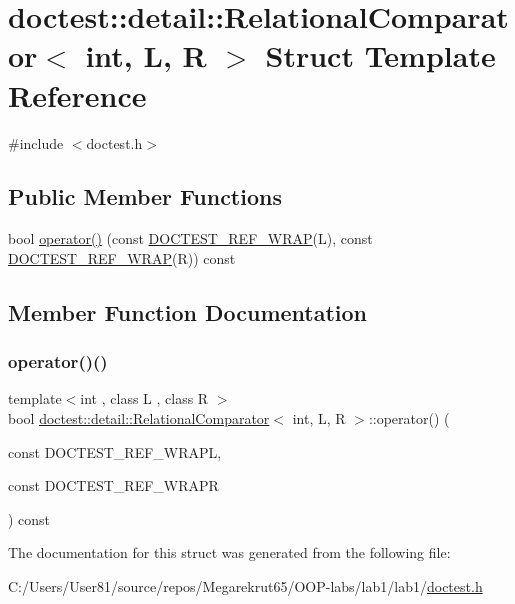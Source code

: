 \hypertarget{structdoctest_1_1detail_1_1_relational_comparator}{}\section{doctest\+:\+:detail\+:\+:Relational\+Comparator$<$ int, L, R $>$ Struct Template Reference}
\label{structdoctest_1_1detail_1_1_relational_comparator}


{\ttfamily \#include $<$doctest.\+h$>$}

\subsection*{Public Member Functions}
\begin{DoxyCompactItemize}
\item 
bool \mbox{\hyperlink{structdoctest_1_1detail_1_1_relational_comparator_a51062ad46cd23c982838a0a51df70512}{operator()}} (const \mbox{\hyperlink{doctest_8h_af2901cafb023c57fb672ccb1bf14f2eb}{D\+O\+C\+T\+E\+S\+T\+\_\+\+R\+E\+F\+\_\+\+W\+R\+AP}}(L), const \mbox{\hyperlink{doctest_8h_af2901cafb023c57fb672ccb1bf14f2eb}{D\+O\+C\+T\+E\+S\+T\+\_\+\+R\+E\+F\+\_\+\+W\+R\+AP}}(R)) const
\end{DoxyCompactItemize}


\subsection{Member Function Documentation}
\mbox{\label{structdoctest_1_1detail_1_1_relational_comparator_a51062ad46cd23c982838a0a51df70512}} 
\subsubsection{\texorpdfstring{operator()()}{operator()()}}
{\footnotesize\ttfamily template$<$int , class L , class R $>$ \\
bool \mbox{\hyperlink{structdoctest_1_1detail_1_1_relational_comparator}{doctest\+::detail\+::\+Relational\+Comparator}}$<$ int, L, R $>$\+::operator() (\begin{DoxyParamCaption}\item[{const }]{D\+O\+C\+T\+E\+S\+T\+\_\+\+R\+E\+F\+\_\+\+W\+R\+APL,  }\item[{const }]{D\+O\+C\+T\+E\+S\+T\+\_\+\+R\+E\+F\+\_\+\+W\+R\+APR }\end{DoxyParamCaption}) const\hspace{0.3cm}{\ttfamily [inline]}}



The documentation for this struct was generated from the following file\+:\begin{DoxyCompactItemize}
\item 
C\+:/\+Users/\+User81/source/repos/\+Megarekrut65/\+O\+O\+P-\/labs/lab1/lab1/\mbox{\hyperlink{doctest_8h}{doctest.\+h}}\end{DoxyCompactItemize}
